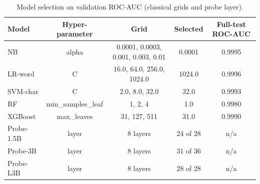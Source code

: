 \begin{table}[t]
\centering
\caption{Model selection on validation ROC-AUC (classical grids and probe layer).}
\label{tab:hp}
\footnotesize
\begin{tabular}{lcccc}
\toprule
\textbf{Model} & \textbf{Hyper-parameter} & \textbf{Grid} & \textbf{Selected} & \textbf{Full-test ROC-AUC} \\
\midrule
NB & alpha & 0.0001, 0.0003, 0.001, 0.003, 0.01 & 0.0001 & 0.9995 \\
LR-word & C & 16.0, 64.0, 256.0, 1024.0 & 1024.0 & 0.9996 \\
SVM-char & C & 2.0, 8.0, 32.0 & 32.0 & 0.9993 \\
RF & min\_samples\_leaf & 1, 2, 4 & 1.0 & 0.9980 \\
XGBoost & max\_leaves & 31, 127, 511 & 31.0 & 0.9990 \\
Probe-1.5B & layer & 8 layers & 24 of 28 & n/a \\
Probe-3B & layer & 8 layers & 31 of 36 & n/a \\
Probe-L3B & layer & 8 layers & 28 of 28 & n/a \\
\bottomrule
\end{tabular}
\end{table}